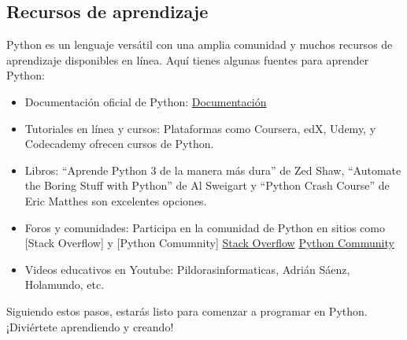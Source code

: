\subsection{Recursos de aprendizaje}

Python es un lenguaje versátil con una amplia comunidad y muchos recursos de aprendizaje disponibles en línea. Aquí tienes algunas fuentes para aprender Python:

\begin{itemize}
  \item Documentación oficial de Python:
  \href{https://docs.python.org/3/}{Documentación}

  \item Tutoriales en línea y cursos: Plataformas como Coursera, edX, Udemy, y Codecademy ofrecen cursos de Python.
  \item Libros: ``Aprende Python 3 de la manera más dura'' de Zed Shaw, ``Automate the Boring Stuff with Python'' de Al Sweigart y ``Python Crash Course'' de Eric Matthes son excelentes opciones.
  \item Foros y comunidades: Participa en la comunidad de Python en sitios como [Stack Overflow] y [Python Comumnity]
  \href{https://stackoverflow.com/questions/tagged/python}{Stack Overflow}
  \href{https://www.python.org/community/}{Python Community}
  \item Videos educativos en Youtube: Pildorasinformaticas, Adrián Sáenz, Holamundo, etc.
\end{itemize}
Siguiendo estos pasos, estarás listo para comenzar a programar en Python. ¡Diviértete aprendiendo y creando! 